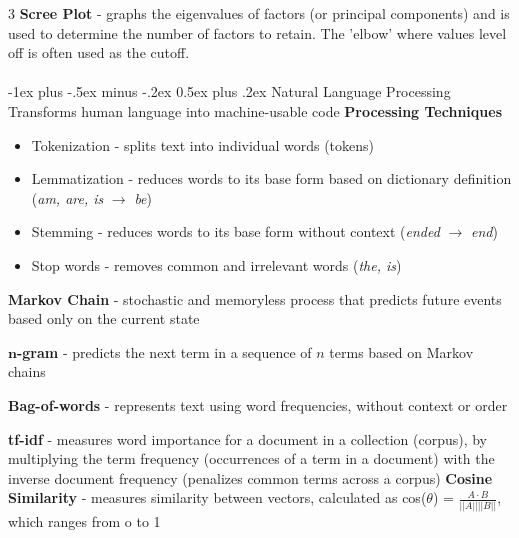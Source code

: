 \documentclass[10pt,landscape]{article}
\makeatletter
\renewcommand{\section}{\@startsection{section}{1}{0mm}%
                                {-1ex plus -.5ex minus -.2ex}%
                                {0.5ex plus .2ex}%
                                {\normalfont\large\bfseries}}
\makeatother
\begin{document}
\begin{multicols}{3}
    \smallskip
    \textbf{Scree Plot} - graphs the eigenvalues of factors (or principal components) and is used to determine the number of factors to retain. The 'elbow' where values level off is often used as the cutoff.
    \\\textcolor{white}{.}\vspace{-5mm}\\ %
    \section{Natural Language Processing}
    Transforms human language into machine-usable code
    \textbf{Processing Techniques}
    \begin{itemize}[label={--},leftmargin=4mm]
        \itemsep -.4mm
        \item Tokenization - splits text into individual words (tokens)
        \item Lemmatization - reduces words to its base form based on dictionary definition (\emph{am, are, is} $\to$ \emph{be})
        \item Stemming - reduces words to its base form without context (\emph{ended} $\to$ \emph{end})
        \item Stop words - removes common and irrelevant words (\emph{the, is})
    \end{itemize}

    \textbf{Markov Chain} - stochastic and memoryless process that predicts future events based only on the current state

    $\boldsymbol{n}$\textbf{-gram} - predicts the next term in a sequence of $n$ terms based on Markov chains

    \textbf{Bag-of-words} - represents text using word frequencies, without context or order

    \textbf{tf-idf} - measures word importance for a document in a collection (corpus), by multiplying the term frequency (occurrences of a term in a document) with the inverse document frequency (penalizes common terms across a corpus)
    \textbf{Cosine Similarity} - measures similarity between vectors, calculated as cos($\theta$) =
    $\frac{A\cdot B}{||A||||B||} $, which ranges from o to 1


\end{multicols}
\end{document}
